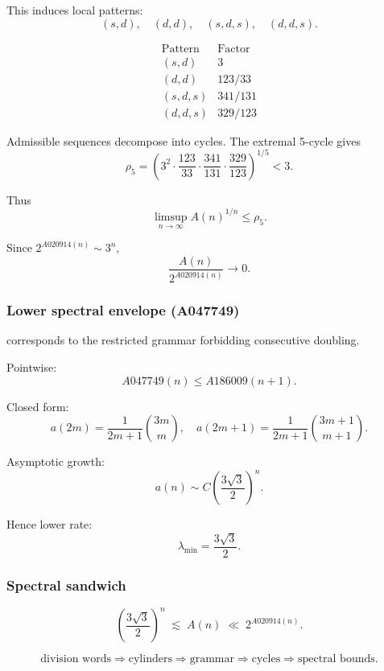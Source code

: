\documentclass[12pt, oneside]{article}
\numberwithin{equation}{section}
\theoremstyle{definition}
\theoremstyle{plain}
\theoremstyle{remark}
\begin{document}
This induces local patterns:
\[
(s,d), \quad (d,d), \quad (s,d,s), \quad (d,d,s).
\]

\[
\begin{array}{c|c}
\text{Pattern} & \text{Factor} \\
\hline
(s,d) & 3 \\
(d,d) & 123/33 \\
(s,d,s) & 341/131 \\
(d,d,s) & 329/123
\end{array}
\]

Admissible sequences decompose into cycles. The extremal 5-cycle gives
\[
\rho_5 =
\left(
3^2 \cdot \frac{123}{33} \cdot \frac{341}{131} \cdot \frac{329}{123}
\right)^{1/5}
< 3.
\]

Thus
\[
\limsup_{n\to\infty} A(n)^{1/n} \le \rho_5.
\]

Since $2^{A020914(n)} \sim 3^n$,
\[
\frac{A(n)}{2^{A020914(n)}} \to 0.
\]

\subsubsection*{Lower spectral envelope (A047749)}
\label{app:A047749-lower-bound}

 corresponds to the restricted grammar forbidding consecutive doubling.

Pointwise:
\[
A047749(n) \le A186009(n+1).
\]

Closed form:
\[
a(2m) = \frac{1}{2m+1}\binom{3m}{m}, \quad
a(2m+1) = \frac{1}{2m+1}\binom{3m+1}{m+1}.
\]

Asymptotic growth:
\[
a(n) \sim C\left(\frac{3\sqrt{3}}{2}\right)^n.
\]

Hence lower rate:
\[
\lambda_{\min} = \frac{3\sqrt{3}}{2}.
\]

\subsubsection*{Spectral sandwich}

\[
\left(\frac{3\sqrt{3}}{2}\right)^n
\;\lesssim\;
A(n)
\;\ll\;
2^{A020914(n)}.
\]

\[
\text{division words}
\Rightarrow
\text{cylinders}
\Rightarrow
\text{grammar}
\Rightarrow
\text{cycles}
\Rightarrow
\text{spectral bounds}.
\]


\clearpage


\end{document}
